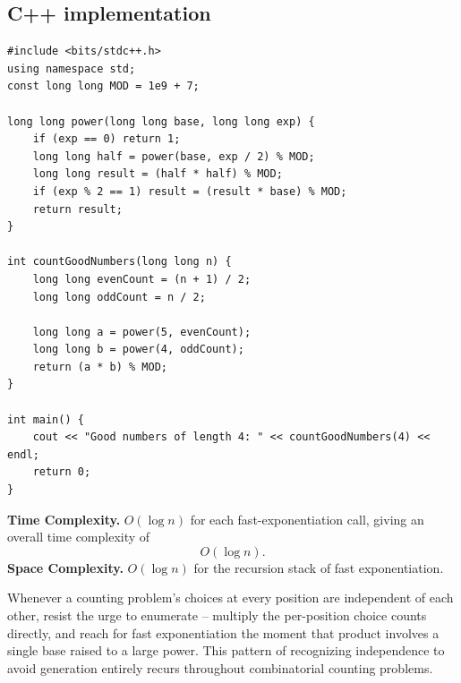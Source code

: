 \subsection*{C++ implementation}

\begin{lstlisting}
#include <bits/stdc++.h>
using namespace std;
const long long MOD = 1e9 + 7;

long long power(long long base, long long exp) {
    if (exp == 0) return 1;
    long long half = power(base, exp / 2) % MOD;
    long long result = (half * half) % MOD;
    if (exp % 2 == 1) result = (result * base) % MOD;
    return result;
}

int countGoodNumbers(long long n) {
    long long evenCount = (n + 1) / 2;
    long long oddCount = n / 2;

    long long a = power(5, evenCount);
    long long b = power(4, oddCount);
    return (a * b) % MOD;
}

int main() {
    cout << "Good numbers of length 4: " << countGoodNumbers(4) << endl;
    return 0;
}
\end{lstlisting}

\begin{complexitybox}
\textbf{Time Complexity.} $O(\log n)$ for each fast-exponentiation call,
giving an overall time complexity of
\[
  O(\log n).
\]
\textbf{Space Complexity.} $O(\log n)$ for the recursion stack of fast
exponentiation.
\end{complexitybox}

\begin{takeawaybox}
Whenever a counting problem's choices at every position are independent
of each other, resist the urge to enumerate -- multiply the per-position
choice counts directly, and reach for fast exponentiation the moment that
product involves a single base raised to a large power. This pattern of
recognizing independence to avoid generation entirely recurs throughout
combinatorial counting problems.
\end{takeawaybox}
